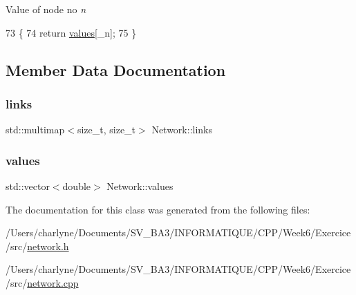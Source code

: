 Value of node no {\itshape n} 
\begin{DoxyCode}
73 \{
74     \textcolor{keywordflow}{return} \mbox{\hyperlink{classNetwork_ab4062dd3b2fc7825f21a686d76e3c696}{values}}[\_n];
75 \}
\end{DoxyCode}


\subsection{Member Data Documentation}
\mbox{\label{classNetwork_a1b5fbd7815319e330841dbd961d9f8cc}} 
\subsubsection{\texorpdfstring{links}{links}}
{\footnotesize\ttfamily std\+::multimap$<$size\+\_\+t, size\+\_\+t$>$ Network\+::links\hspace{0.3cm}{\ttfamily [private]}}

\mbox{\label{classNetwork_ab4062dd3b2fc7825f21a686d76e3c696}} 
\subsubsection{\texorpdfstring{values}{values}}
{\footnotesize\ttfamily std\+::vector$<$double$>$ Network\+::values\hspace{0.3cm}{\ttfamily [private]}}



The documentation for this class was generated from the following files\+:\begin{DoxyCompactItemize}
\item 
/\+Users/charlyne/\+Documents/\+S\+V\+\_\+\+B\+A3/\+I\+N\+F\+O\+R\+M\+A\+T\+I\+Q\+U\+E/\+C\+P\+P/\+Week6/\+Exercice/src/\mbox{\hyperlink{network_8h}{network.\+h}}\item 
/\+Users/charlyne/\+Documents/\+S\+V\+\_\+\+B\+A3/\+I\+N\+F\+O\+R\+M\+A\+T\+I\+Q\+U\+E/\+C\+P\+P/\+Week6/\+Exercice/src/\mbox{\hyperlink{network_8cpp}{network.\+cpp}}\end{DoxyCompactItemize}

